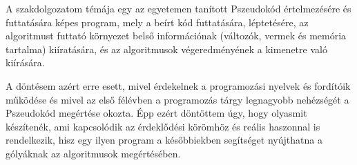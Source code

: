 A szakdolgozatom témája egy az egyetemen tanított Pszeudokód értelmezésére és futtatására képes program, mely a beírt kód futtatására, léptetésére, az algoritmust futtató környezet belső információnak (változók, vermek és memória tartalma) kiíratására, és az algoritmusok végeredményének a kimenetre való kiírására.

A döntésem azért erre esett, mivel érdekelnek a programozási nyelvek és fordítóik működése és mivel az első félévben a programozás tárgy legnagyobb nehézségét a Pszeudokód megértése okozta. Épp ezért döntöttem úgy, hogy olyasmit készítenék, ami kapcsolódik az érdeklődési körömhöz és reális haszonnal is rendelkezik, hisz egy ilyen program a későbbiekben segítséget nyújthatna a gólyáknak az algoritmusok megértésében.